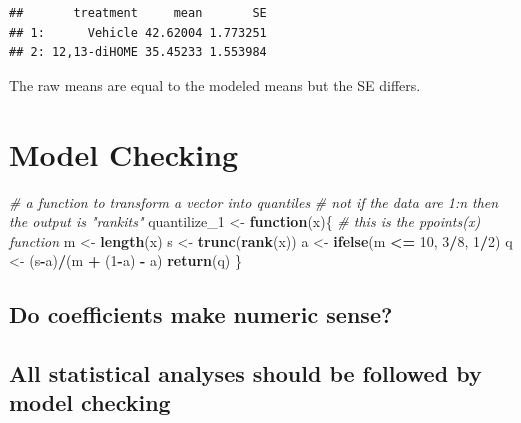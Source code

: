 \documentclass[]{book}
\newenvironment{Shaded}{\begin{snugshade}}{\end{snugshade}}
\newcommand{\CommentTok}[1]{\textcolor[rgb]{0.56,0.35,0.01}{\textit{#1}}}
\newcommand{\ControlFlowTok}[1]{\textcolor[rgb]{0.13,0.29,0.53}{\textbf{#1}}}
\newcommand{\DecValTok}[1]{\textcolor[rgb]{0.00,0.00,0.81}{#1}}
\newcommand{\KeywordTok}[1]{\textcolor[rgb]{0.13,0.29,0.53}{\textbf{#1}}}
\newcommand{\NormalTok}[1]{#1}
\newcommand{\OperatorTok}[1]{\textcolor[rgb]{0.81,0.36,0.00}{\textbf{#1}}}
\newcommand{\StringTok}[1]{\textcolor[rgb]{0.31,0.60,0.02}{#1}}
\begin{document}
\begin{verbatim}
##       treatment     mean       SE
## 1:      Vehicle 42.62004 1.773251
## 2: 12,13-diHOME 35.45233 1.553984
\end{verbatim}

The raw means are equal to the modeled means but the SE differs.

\hypertarget{model-checking}{%
\chapter{Model Checking}\label{model-checking}}

\begin{Shaded}
\begin{Highlighting}[]
\CommentTok{# a function to transform a vector into quantiles}
\CommentTok{# not if the data are 1:n then the output is "rankits"}
\NormalTok{quantilize_}\DecValTok{1}\NormalTok{ <-}\StringTok{ }\ControlFlowTok{function}\NormalTok{(x)\{}
  \CommentTok{# this is the ppoints(x) function}
\NormalTok{  m <-}\StringTok{ }\KeywordTok{length}\NormalTok{(x)}
\NormalTok{  s <-}\StringTok{ }\KeywordTok{trunc}\NormalTok{(}\KeywordTok{rank}\NormalTok{(x))}
\NormalTok{  a <-}\StringTok{ }\KeywordTok{ifelse}\NormalTok{(m }\OperatorTok{<=}\StringTok{ }\DecValTok{10}\NormalTok{, }\DecValTok{3}\OperatorTok{/}\DecValTok{8}\NormalTok{, }\DecValTok{1}\OperatorTok{/}\DecValTok{2}\NormalTok{)}
\NormalTok{  q <-}\StringTok{ }\NormalTok{(s}\OperatorTok{-}\NormalTok{a)}\OperatorTok{/}\NormalTok{(m }\OperatorTok{+}\StringTok{ }\NormalTok{(}\DecValTok{1}\OperatorTok{-}\NormalTok{a) }\OperatorTok{-}\StringTok{ }\NormalTok{a)}
  \KeywordTok{return}\NormalTok{(q)}
\NormalTok{\}}
\end{Highlighting}
\end{Shaded}

\hypertarget{do-coefficients-make-numeric-sense}{%
\section{Do coefficients make numeric sense?}\label{do-coefficients-make-numeric-sense}}

\hypertarget{all-statistical-analyses-should-be-followed-by-model-checking}{%
\section{All statistical analyses should be followed by model checking}\label{all-statistical-analyses-should-be-followed-by-model-checking}}
\end{document}
